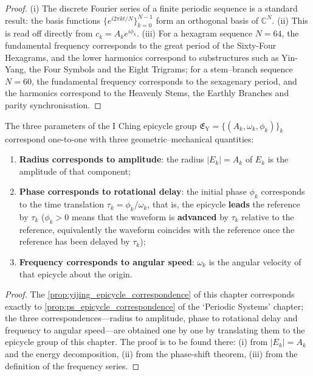 \begin{proof}
(i) The discrete Fourier series of a finite periodic sequence is a standard result: the basis functions $\{e^{i2\pi kt/N}\}_{k=0}^{N-1}$ form an orthogonal basis of $\mathbb C^N$.
(ii) This is read off directly from $c_k=A_k e^{i\phi_k}$.
(iii) For a hexagram sequence $N=64$, the fundamental frequency corresponds to the great period of the Sixty-Four Hexagrams, and the lower harmonics correspond to substructures such as Yin-Yang, the Four Symbols and the Eight Trigrams; for a stem--branch sequence $N=60$, the fundamental frequency corresponds to the sexagenary period, and the harmonics correspond to the Heavenly Stems, the Earthly Branches and parity synchronisation.
\end{proof}

\begin{proposition}\label{prop:yijing_epicycle_correspondence}
The three parameters of the I Ching epicycle group $\mathfrak E_{\mathrm{Y}}=\{(A_k,\omega_k,\phi_k)\}_{k}$ correspond one-to-one with three geometric--mechanical quantities:
\begin{enumerate}[label=(\roman*)]
    \item \textbf{Radius corresponds to amplitude}: the radius $|E_k|=A_k$ of $E_k$ is the amplitude of that component;
    \item \textbf{Phase corresponds to rotational delay}: the initial phase $\phi_k$ corresponds to the time translation $\tau_k=\phi_k/\omega_k$, that is, the epicycle \textbf{leads} the reference by $\tau_k$ ($\phi_k>0$ means that the waveform is \textbf{advanced} by $\tau_k$ relative to the reference, equivalently the waveform coincides with the reference once the reference has been delayed by $\tau_k$);
    \item \textbf{Frequency corresponds to angular speed}: $\omega_k$ is the angular velocity of that epicycle about the origin.
\end{enumerate}
\end{proposition}

\begin{proof}
The \cref{prop:yijing_epicycle_correspondence} of this chapter corresponds exactly to \cref{prop:ps_epicycle_correspondence} of the `Periodic Systems' chapter;
the three correspondences---radius to amplitude, phase to rotational delay and frequency to angular speed---are obtained one by one by translating them to the epicycle group of this chapter.
The proof is to be found there: (i) from $|E_k|=A_k$ and the energy decomposition, (ii) from the phase-shift theorem, (iii) from the definition of the frequency series.
\end{proof}

